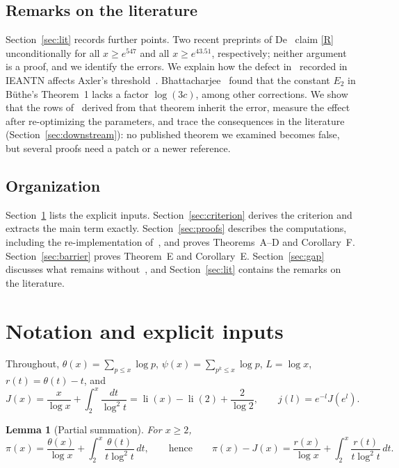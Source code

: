 \documentclass{amsart}
\newtheorem{lemma}[theorem]{Lemma}
\theoremstyle{definition}
\theoremstyle{remark}
\theoremstyle{plain}
\numberwithin{equation}{section}
\DeclareMathOperator{\li}{li}
\begin{document}
\subsection{Remarks on the literature}
Section~\ref{sec:lit} records further points. Two recent preprints of De~\cite{De24a,De24b} claim \eqref{R} unconditionally for all $x\ge e^{547}$ and all $x\ge e^{43.51}$, respectively; neither argument is a proof, and we identify the errors. We explain how the defect in~\cite[Lemma~2.1]{DP15} recorded in IEANTN affects Axler's threshold~\cite{Ax22}. Bhattacharjee~\cite{Bha24} found that the constant $E_2$ in B\"uthe's Theorem~1 lacks a factor $\log(3c)$, among other corrections. We show that the rows of~\cite[Table~8]{BKLNW21} derived from that theorem inherit the error, measure the effect after re-optimizing the parameters, and trace the consequences in the literature (Section~\ref{sec:downstream}): no published theorem we examined becomes false, but several proofs need a patch or a newer reference.

\subsection{Organization}
Section~\ref{sec:inputs} lists the explicit inputs. Section~\ref{sec:criterion} derives the criterion and extracts the main term exactly. Section~\ref{sec:proofs} describes the computations, including the re-implementation of~\cite[Thm.~1.1]{FKS23}, and proves Theorems~A--D and Corollary~F. Section~\ref{sec:barrier} proves Theorem~E and Corollary~E. Section~\ref{sec:gap} discusses what remains without~\cite{OAI26}, and Section~\ref{sec:lit} contains the remarks on the literature.

\section{Notation and explicit inputs}\label{sec:inputs}

Throughout, $\theta(x)=\sum_{p\le x}\log p$, $\psi(x)=\sum_{p^k\le x}\log p$, $L=\log x$, $r(t)=\theta(t)-t$, and
\[
J(x)=\frac{x}{\log x}+\int_2^x\frac{dt}{\log^2t}=\li(x)-\li(2)+\frac{2}{\log2},\qquad j(l)=e^{-l}J(e^l).
\]

\begin{lemma}[Partial summation]\label{lem:ps}
For $x\ge2$,
\[
\pi(x)=\frac{\theta(x)}{\log x}+\int_2^x\frac{\theta(t)}{t\log^2t}\,dt,
\qquad\text{hence}\qquad
\pi(x)-J(x)=\frac{r(x)}{\log x}+\int_2^x\frac{r(t)}{t\log^2t}\,dt.
\]
\end{lemma}
\end{document}

